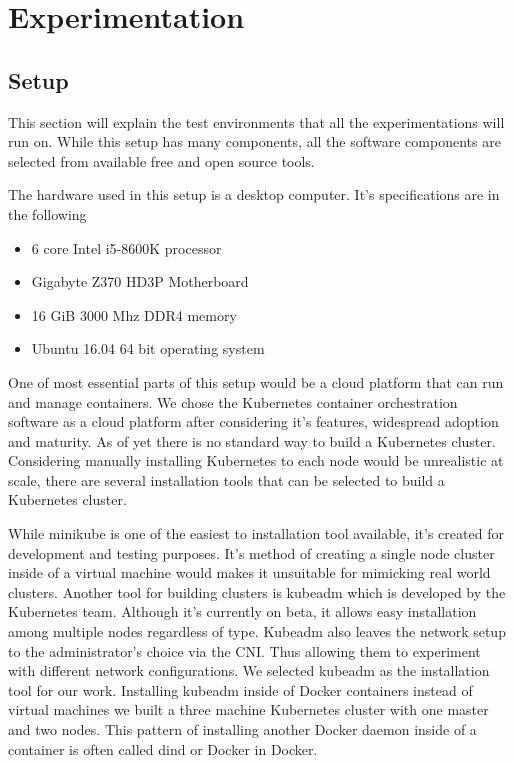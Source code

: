 \documentclass[12pt,oneandhalf,chaparabic,ceng,ms,eng,oneside,pntc]{gsufbe}
\begin{document}

\chapter{Experimentation}
\section{Setup}
This section will explain the test environments that all the experimentations will run on.  While this
setup has many components, all the software components are selected from available free and open source
tools.

The hardware used in this setup is a desktop computer.  It's specifications are in the following
\begin{itemize}
 \item 6 core Intel i5-8600K processor
 \item Gigabyte Z370 HD3P Motherboard
 \item 16 GiB 3000 Mhz DDR4 memory
 \item Ubuntu 16.04 64 bit operating system
\end{itemize}

One of most essential parts of this setup would be a cloud platform that can run and manage containers.
We chose the Kubernetes container orchestration software as a cloud platform after considering it's
features, widespread adoption and maturity.  As of yet there is no standard way to build a Kubernetes
cluster.  Considering manually installing Kubernetes to each node would be unrealistic at scale, there
are several installation tools that can be selected to build a Kubernetes cluster.

While minikube is one of the easiest to installation tool available, it's created for development and
testing purposes.  It's method of creating a single node
cluster inside of a virtual machine would makes it unsuitable for mimicking real world clusters.  Another
tool for building clusters is kubeadm which is developed by the Kubernetes team.  Although it's currently
on beta, it allows easy installation among multiple nodes regardless of type. Kubeadm also leaves the
network setup to the administrator's choice via the CNI.  Thus allowing them to experiment with different
network configurations. We selected kubeadm as the 
installation tool for our work.  Installing kubeadm inside of Docker containers instead of virtual
machines we built a three machine Kubernetes cluster with one master and two nodes.  This pattern of 
installing another Docker daemon inside of a container is often called dind or Docker in Docker.
\end{document}
